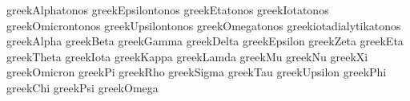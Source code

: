 \stopencoding


\startencoding[uc]

 greekAlphatonos         {}
 greekEpsilontonos       {}
 greekEtatonos           {}
 greekIotatonos          {}
 greekOmicrontonos       {}
 greekUpsilontonos       {}
 greekOmegatonos         {}
 greekiotadialytikatonos {}
 greekAlpha              {}
 greekBeta               {}
 greekGamma              {}
 greekDelta              {}
 greekEpsilon            {}
 greekZeta               {}
 greekEta                {}
 greekTheta              {}
 greekIota               {}
 greekKappa              {}
 greekLamda              {}
 greekMu                 {}
 greekNu                 {}
 greekXi                 {}
 greekOmicron            {}
 greekPi                 {}
 greekRho                {}
 greekSigma              {}
 greekTau                {}
 greekUpsilon            {}
 greekPhi                {}
 greekChi                {}
 greekPsi                {}
 greekOmega              {}


